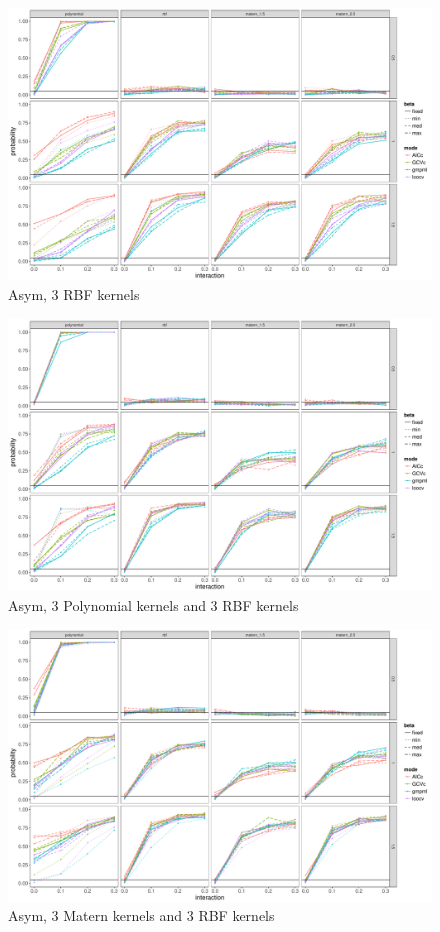 \documentclass[11pt]{article}
\begin{document}
\begin{figure}
\begin{center}
\includegraphics[width=0.9\columnwidth]{exp_A3} 
\caption{Asym, 3 RBF kernels}
\label{fig:res}
\end{center}
\end{figure}

\begin{figure}
\begin{center}
\includegraphics[width=0.9\columnwidth]{exp_A4} 
\caption{Asym, 3 Polynomial kernels and 3 RBF kernels}
\label{fig:res}
\end{center}
\end{figure}

\begin{figure}
\begin{center}
\includegraphics[width=0.9\columnwidth]{exp_A5} 
\caption{Asym, 3 Matern kernels and 3 RBF kernels}
\label{fig:res}
\end{center}
\end{figure}
\end{document}
